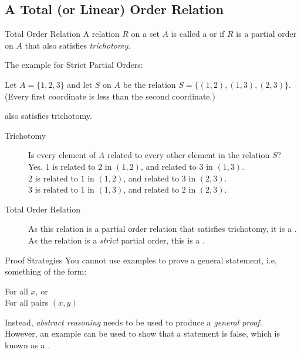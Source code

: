 \documentclass[../notes.tex]{subfiles}
\begin{document}
			\subsection{A Total (or Linear) Order Relation}
				\begin{definition}{Total Order Relation}
					A relation $R$ on a set $A$ is called a  or  if $R$ is a partial order on $A$ that also satisfies \emph{trichotomy}.
				\end{definition}
				\begin{example}
					The example for Strict Partial Orders:
					\begin{indentparagraph}
						Let $A = \{1, 2, 3\}$ and let $S$ on $A$ be the relation $S = \bigl\{(1, 2), (1, 3), (2, 3)\bigr\}$. (Every first coordinate is less than the second coordinate.)
					\end{indentparagraph}
					also satisfies trichotomy.
					\begin{description}
						\item[Trichotomy] Is every element of $A$ related to every other element in the relation $S$?\\
							Yes. $1$ is related to $2$ in $(1, 2)$, and related to $3$ in $(1, 3)$.\\
							$2$ is related to $1$ in $(1, 2)$, and related to $3$ in $(2, 3)$.\\
							$3$ is related to $1$ in $(1, 3)$, and related to $2$ in $(2, 3)$.
						\item[Total Order Relation] As this relation is a partial order relation that satisfies trichotomy, it is a . As the relation is a \emph{strict} partial order, this is a .
					\end{description}
				\end{example}
				\begin{sidenote}{Proof Strategies}
					You cannot use examples to prove a general statement, i.e, something of the form:
						\begin{indentparagraph}
							For all $x$, or\\
							For all pairs $(x, y)$
						\end{indentparagraph}
					Instead, \emph{abstract reasoning} needs to be used to produce a \emph{general proof}.\\
					However, an example can be used to show that a statement is false, which is known as a .
				\end{sidenote}
\end{document}
